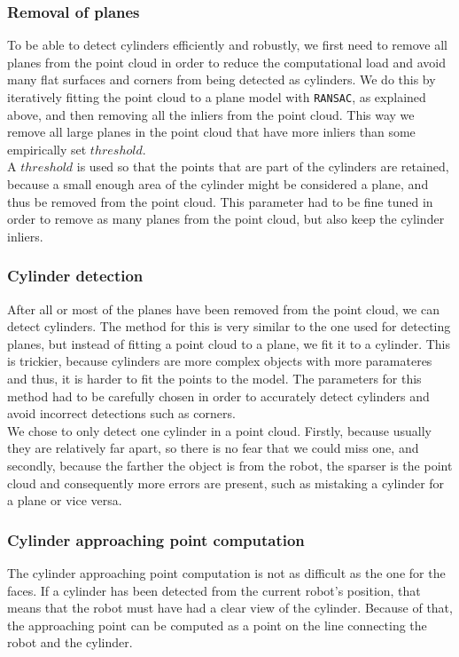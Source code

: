 \documentclass[12pt,a4paper]{article}
\begin{document}
	\subsubsection{Removal of planes}
	To be able to detect cylinders efficiently and robustly, we first need to remove all planes from the point cloud in order to reduce the computational load and avoid many flat surfaces and corners from being detected as cylinders. We do this by iteratively fitting the point cloud to a plane model with \texttt{RANSAC}, as explained above, and then removing all the inliers from the point cloud. This way we remove all large planes in the point cloud that have more inliers than some empirically set $threshold$. \\
	
	A $threshold$ is used so that the points that are part of the cylinders are retained, because a small enough area of the cylinder might be considered a plane, and thus be removed from the point cloud. This parameter had to be fine tuned in order to remove as many planes from the point cloud, but also keep the cylinder inliers. \\

	\subsubsection{Cylinder detection}
	After all or most of the planes have been removed from the point cloud, we can detect cylinders. The method for this is very similar to the one used for detecting planes, but instead of fitting a point cloud to a plane, we fit it to a cylinder. This is trickier, because cylinders are more complex objects with more paramateres and thus, it is harder to fit the points to the model. The parameters for this method had to be carefully chosen in order to accurately detect cylinders and avoid incorrect detections such as corners. \\

	We chose to only detect one cylinder in a point cloud. Firstly, because usually they are relatively far apart, so there is no fear that we could miss one, and secondly, because the farther the object is from the robot, the sparser is the point cloud and consequently more errors are present, such as mistaking a cylinder for a plane or vice versa. \\
	
	\subsubsection{Cylinder approaching point computation}
	The cylinder approaching point computation is not as difficult as the one for the faces. If a cylinder has been detected from the current robot's position, that means that the robot must have had a clear view of the cylinder. Because of that, the approaching point can be computed as a point on the line connecting the robot and the cylinder. \\
	
\end{document}
